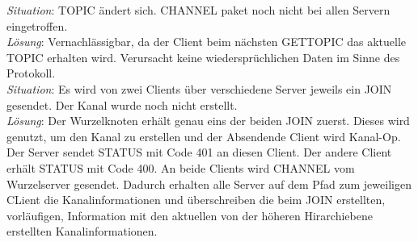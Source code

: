\documentclass{article}
\begin{document}
\emph{Situation}: TOPIC ändert sich. CHANNEL paket noch nicht bei allen Servern eingetroffen.\\
\emph{Lösung}: Vernachlässigbar, da der Client beim nächsten GETTOPIC das aktuelle TOPIC erhalten wird. Verursacht keine wiedersprüchlichen Daten im Sinne des Protokoll.\\

\emph{Situation}: Es wird von zwei Clients über verschiedene Server jeweils ein JOIN gesendet. Der Kanal wurde noch  nicht erstellt.\\
\emph{Lösung}: Der Wurzelknoten erhält genau eins der beiden JOIN zuerst. Dieses wird genutzt, um den Kanal zu erstellen und der Absendende Client wird Kanal-Op. Der Server sendet STATUS mit Code 401 an diesen Client. Der andere Client erhält STATUS mit Code 400. An beide Clients wird CHANNEL vom Wurzelserver gesendet. Dadurch erhalten alle Server auf dem Pfad zum jeweiligen CLient die Kanalinformationen und überschreiben die beim JOIN erstellten, vorläufigen, Information mit den aktuellen von der höheren Hirarchiebene erstellten Kanalinformationen.
\end{document}
